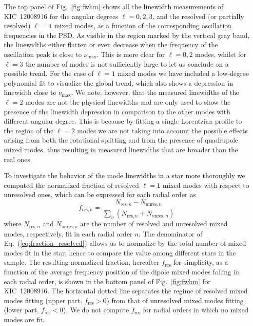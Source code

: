 \documentclass[structabstract]{aa}
\newcommand{\numax}{\nu_\mathrm{max}}
\newcommand{\kic}{KIC~12008916}
\begin{document}
The top panel of Fig.~\ref{fig:fwhm} shows all the linewidth measurements of \kic\,\,for the angular degrees $\ell = 0,2,3$, and the resolved (or partially resolved) $\ell = 1$ mixed modes, as a function of the corresponding oscillation frequencies in the PSD. As visible in the region marked by the vertical gray band, the linewidths either flatten or even decrease when the frequency of the oscillation peak is close to $\numax$. This is more clear for $\ell = 0,2$ modes, whilst for $\ell = 3$ the number of modes is not sufficiently large to let us conclude on a possible trend. For the case of $\ell = 1$ mixed modes we have included a low-degree polynomial fit to visualize the global trend, which also shows a depression in linewidth close to $\numax$. We note, however, that the measured linewidths of the $\ell = 2$ modes are not the physical linewidths and are only used to show the presence of the linewidth depression in comparison to the other modes with different angular degree. This is because by fitting a single Lorentzian profile to the region of the $\ell = 2$ modes we are not taking into account the possible effects arising from both the rotational splitting and from the presence of quadrupole mixed modes, thus resulting in measured linewidths that are broader than the real ones.

To investigate the behavior of the mode linewidths in a star more thoroughly we computed the normalized fraction of resolved $\ell =1$ mixed modes with respect to unresolved ones, which can be expressed for each radial order as
\begin{equation}
f_{\mathrm{res},n} = \frac{N_{\mathrm{res},n} - N_{\mathrm{unres},n}}{\sum_n \left( N_{\mathrm{res},n} + N_{\mathrm{unres},n} \right) }
\label{eq:fraction_resolved}
\end{equation}
where $N_{\mathrm{res},n}$ and $N_{\mathrm{unres},n}$ are the number of resolved and unresolved mixed modes, respectively, fit in each radial order $n$. The denominator of Eq.~(\ref{eq:fraction_resolved}) allows us to normalize by the total number of mixed modes fit in the star, hence to compare the value among different stars in the sample. The resulting normalized fraction, hereafter $f_\mathrm{res}$ for simplicity, as a function of the average frequency position of the dipole mixed modes falling in each radial order, is shown in the bottom panel of Fig.~\ref{fig:fwhm} for \kic. The horizontal dotted line separates the regime of resolved mixed modes fitting (upper part, $f_\mathrm{res} > 0$) from that of unresolved mixed modes fitting (lower part, $f_\mathrm{res} < 0$). We do not compute $f_\mathrm{res}$ for radial orders in which no mixed modes are fit. 
\end{document}
